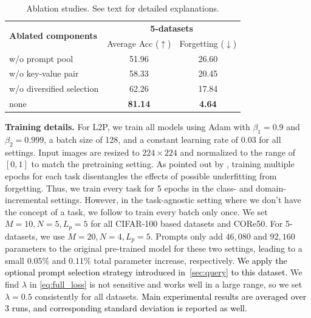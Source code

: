 \documentclass[10pt,twocolumn,letterpaper]{article}
\newcommand{\zizhaoz}[1]{\textcolor{black}{#1}}
\newcommand{\zifeng}[1]{\textcolor{black}{#1}}
\newcommand{\methodabbr}{L2P\xspace}
\begin{document}
\begin{table}[t]
\small
\caption{Ablation studies. See text for detailed explanations. %
} \vspace{-.5cm}
\label{table:ablation_5_datasets}
\begin{center}
\begin{tabular}{l|cc}
\toprule  
\multirow{2}{*}{\textbf{Ablated components}} & \multicolumn{2}{c}{\textbf{5-datasets}} \\
 & Average Acc ($\uparrow$) & Forgetting ($\downarrow$) \\
\midrule
 w/o prompt pool &  51.96 & 26.60 \\
 w/o key-value pair &  58.33 & 20.45 \\
 w/o diversified selection  & 62.26 & 17.84 \\ \midrule
 none & \bf{81.14} & \bf{4.64} \\
\bottomrule
\end{tabular}
\end{center}
\vspace{-.5cm}
\end{table}


\textbf{Training details.} 
For \methodabbr, we train all models using Adam \cite{kingma2014adam} with $\beta_1= 0.9$ and $\beta_2=0.999$, a batch size of 128, and a constant learning rate of $0.03$ for all settings. 
Input images are resized to $224\times224$ and normalized to the range of $[0, 1]$ to match the pretraining setting. 
As pointed out by \cite{buzzega2020dark}, training multiple epochs for each task disentangles the effects of possible underfitting from forgetting. 
Thus, we train every task for 5 epochs in the class- and domain-incremental settings. 
However, in the task-agnostic setting where we don't have the concept of a task, we follow \cite{shanahan2021encoders} to train every batch only once. 
We set $M= 10,N= 5,L_p= 5$ for all CIFAR-100 based datasets and CORe50. 
For 5-datasets, we use $M= 20,N= 4,L_p= 5$. 
Prompts only add $46,080$ and $92,160$ parameters to the original pre-trained model for these two settings, leading to a small $0.05\%$ and $ 0.11\%$ total parameter increase, respectively. \zizhaoz{We apply the optional prompt selection strategy introduced in~\ref{sec:query} to this dataset.}
We find $\lambda$ in \eqref{eq:full_loss} is not sensitive and works well in a large range, so we set $\lambda=0.5$ consistently for all datasets. \zifeng{Main experimental results are averaged over 3 runs, and corresponding standard deviation is reported as well.}
\end{document}
